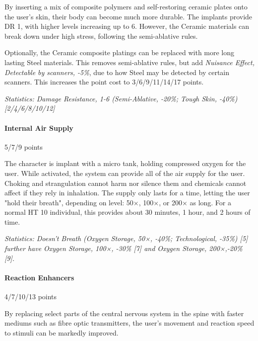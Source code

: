 \begin{multicols*}{3}
	By inserting a mix of composite polymers and self-restoring ceramic plates onto the user's skin, their body can become much more durable. The implants provide DR 1, with higher levels increasing up to 6. However, the Ceramic materials can break down under high stress, following the semi-ablative rules.
	
	Optionally, the Ceramic composite platings can be replaced with more long lasting Steel materials. This removes semi-ablative rules, but add \textit{Nuisance Effect, Detectable by scanners, -5\%}, due to how Steel may be detected by certain scanners. This increases the point cost to 3/6/9/11/14/17 points.
	
	\textit{\textcolor{OliveGreen}{Statistics: Damage Resistance, 1-6 (Semi-Ablative, -20\%; Tough Skin, -40\%) [2/4/6/8/10/12]}}
	
	\paragraph{Internal Air Supply}
	\begin{flushright}
		5/7/9 points
	\end{flushright}
	
	The character is implant with a micro tank, holding compressed oxygen for the user. While activated, the system can provide all of the air supply for the user. Choking and strangulation cannot harm nor silence them and chemicals cannot affect if they rely in inhalation. The supply only lasts for a time, letting the user "hold their breath", depending on level: 50×, 100×, or 200× as long. For a normal HT 10 individual, this provides about 30 minutes, 1 hour, and 2 hours of time.
	
	\textit{\textcolor{OliveGreen}{Statistics: Doesn't Breath (Oxygen Storage, 50×, -40\%; Technological, -35\%) [5] further have Oxygen Storage, 100×, -30\% [7] and Oxygen Storage, 200×,-20\% [9].}}
	
	\paragraph{Reaction Enhancers}
	\begin{flushright}
		4/7/10/13 points
	\end{flushright}
	
	By replacing select parts of the central nervous system in the spine with faster mediums such as fibre optic transmitters, the user's movement and reaction speed to stimuli can be markedly improved.
	

\end{multicols*}
